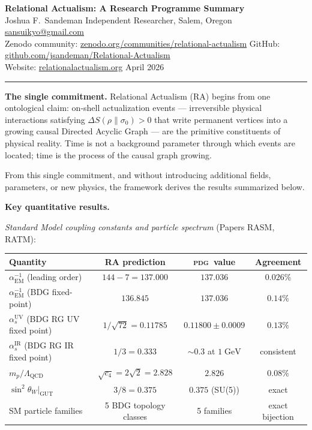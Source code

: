 \documentclass[11pt]{article}
\newcommand{\PDG}{\textsc{pdg}}
\begin{document}
\begin{center}
  {\large\bfseries Relational Actualism: A Research Programme Summary}\\[6pt]
  {\normalsize Joshua F.\ Sandeman\quad\textbar\quad
   Independent Researcher, Salem, Oregon\quad\textbar\quad
   \href{mailto:sansuikyo@gmail.com}{sansuikyo@gmail.com}}\\[4pt]
  {\small
   Zenodo community: \href{https://zenodo.org/communities/relational-actualism}{zenodo.org/communities/relational-actualism}\quad\textbar\quad
   GitHub: \href{https://github.com/jsandeman/Relational-Actualism}{github.com/jsandeman/Relational-Actualism}\\
   Website: \href{https://relationalactualism.org}{relationalactualism.org}\quad\textbar\quad
   April 2026}
\end{center}

\bigskip
\hrule
\bigskip

\noindent
\textbf{The single commitment.}
Relational Actualism (RA) begins from one ontological claim: on-shell actualization
events — irreversible physical interactions satisfying $\Delta S(\rho\|\sigma_0) > 0$
that write permanent vertices into a growing causal Directed Acyclic Graph —
are the primitive constituents of physical reality.
Time is not a background parameter through which events are located;
time is the process of the causal graph growing.

From this single commitment, and without introducing additional fields,
parameters, or new physics, the framework derives the results summarized below.

\bigskip

\noindent\textbf{Key quantitative results.}

\medskip
\noindent\textit{Standard Model coupling constants and particle spectrum}
(Papers RASM, RATM):

\begin{center}
\small
\begin{tabular}{lccc}
\toprule
Quantity & RA prediction & \PDG\ value & Agreement \\
\midrule
$\alpha_{\mathrm{EM}}^{-1}$ (leading order) & $144 - 7 = 137.000$ & $137.036$ & $0.026\%$ \\
$\alpha_{\mathrm{EM}}^{-1}$ (BDG fixed-point) & $136.845$ & $137.036$ & $0.14\%$ \\
$\alpha_s^{\mathrm{UV}}$ (BDG RG UV fixed point) & $1/\sqrt{72} = 0.11785$ & $0.11800 \pm 0.0009$ & $0.13\%$ \\
$\alpha_s^{\mathrm{IR}}$ (BDG RG IR fixed point) & $1/3 = 0.333$ & $\sim\!0.3$ at $1\;\mathrm{GeV}$ & consistent \\
$m_p/\Lambda_{\mathrm{QCD}}$ & $\sqrt{c_4} = 2\sqrt{2} = 2.828$ & $2.826$ & $0.08\%$ \\
$\sin^2\theta_W|_{\mathrm{GUT}}$ & $3/8 = 0.375$ & $0.375$ (SU(5)) & exact \\
SM particle families & 5 BDG topology classes & 5 families & exact bijection \\
\bottomrule
\end{tabular}
\end{center}
\end{document}
